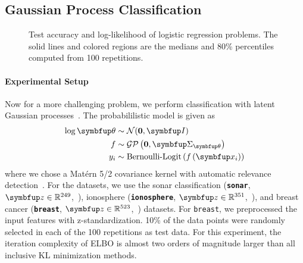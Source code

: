 \subsection{Gaussian Process Classification}\label{section:bgp}
%
\begin{figure}[H]
  \centering
  \caption{Test accuracy and log-likelihood of logistic regression problems.
    The solid lines and colored regions are the medians and 80\% percentiles computed from 100 repetitions.
  }\label{fig:logistic}
\end{figure}
%

%
\paragraph{Experimental Setup}
Now for a more challenging problem, we perform classification with latent Gaussian processes~\citep{rasmussen_gaussian_2006, NIPS2014_8c6744c9}.
The probabililistic model is given as
\begin{align*}
  \log \vtheta &\sim \mathcal{N}(\mathbf{0}, \mI) \\
   f &\sim \mathcal{GP}\left(\mathbf{0}, \mSigma_{\vtheta}\right) \\
   y_i &\sim \text{Bernoulli-Logit}\left(  f\left( \vx_i \right) \right)
\end{align*}
where we chose a Mat\'ern 5/2 covariance kernel with automatic relevance detection~\citep{neal_bayesian_1996}.
For the datasets, we use the sonar classification (\textbf{\texttt{sonar}}, \(\vz \in \mathbb{R}^{249}\),~\citealt{gorman_analysis_1988}), ionosphere (\textbf{\texttt{ionosphere}}, \(\vz \in \mathbb{R}^{351}\),~\citealt{Sigillito1989ClassificationOR}), and breast cancer (\textbf{\texttt{breast}}, \(\vz \in \mathbb{R}^{523}\),~\citealt{wolberg_multisurface_1990}) datasets.
For \texttt{breast}, we preprocessed the input features with z-standardization.
10\% of the data points were randomly selected in each of the 100 repetitions as test data.
For this experiment, the iteration complexity of ELBO is almost two orders of magnitude larger than all inclusive KL minimization methods.

